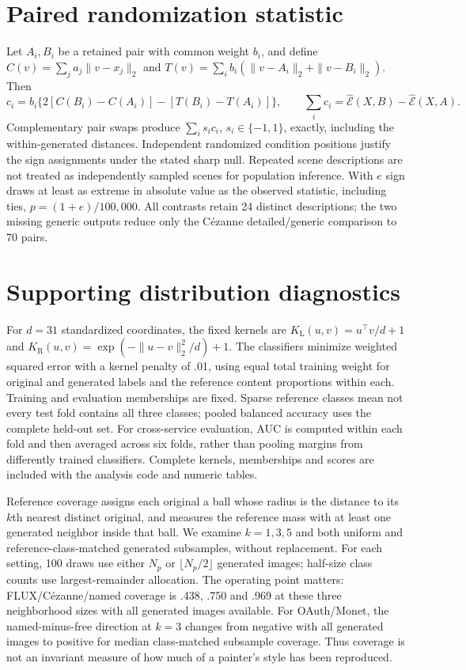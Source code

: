 \documentclass[11pt]{article}
\newcommand{\E}{\widehat{\mathcal E}}
\begin{document}
\section{Paired randomization statistic}
\label{app:inference}
Let $A_i,B_i$ be a retained pair with common weight $b_i$, and define
$C(v)=\sum_j a_j\|v-x_j\|_2$ and
$T(v)=\sum_i b_i(\|v-A_i\|_2+\|v-B_i\|_2)$. Then
\begin{equation}
 c_i=b_i\{2[C(B_i)-C(A_i)]-[T(B_i)-T(A_i)]\},\qquad
 \sum_i c_i=\E(X,B)-\E(X,A).
\end{equation}
Complementary pair swaps produce $\sum_i s_i c_i$, $s_i\in\{-1,1\}$, exactly,
including the within-generated distances. Independent randomized condition
positions justify the sign assignments under the stated sharp null. Repeated
scene descriptions are not treated as independently sampled scenes for
population inference. With $e$ sign draws at least as extreme in absolute value
as the observed statistic, including ties, $p=(1+e)/100{,}000$. All contrasts
retain 24 distinct descriptions; the two missing generic outputs reduce only
the C\'ezanne detailed/generic comparison to 70 pairs.

\section{Supporting distribution diagnostics}
\label{app:diagnostics}
For $d=31$ standardized coordinates, the fixed kernels are
$K_{\mathrm L}(u,v)=u^\top v/d+1$ and
$K_{\mathrm R}(u,v)=\exp(-\|u-v\|_2^2/d)+1$.
The classifiers minimize weighted squared error with a kernel penalty of .01,
using equal total training weight for original and generated labels and the
reference content proportions within each. Training and evaluation memberships
are fixed. Sparse reference classes mean not every test fold contains all three
classes; pooled balanced accuracy uses the complete held-out set. For cross-service evaluation, AUC is computed within each fold and then
averaged across six folds, rather than pooling margins from differently trained
classifiers. Complete kernels, memberships and scores are included with the
analysis code and numeric tables.

Reference coverage assigns each original a ball whose radius is the distance
to its $k$th nearest distinct original, and measures the reference mass with at
least one generated neighbor inside that ball. We examine $k=1,3,5$ and both
uniform and reference-class-matched generated subsamples, without replacement.
For each setting, 100 draws use either $N_p$ or $\lfloor N_p/2\rfloor$ generated
images; half-size class counts use largest-remainder allocation.
The operating point matters: FLUX/C\'ezanne/named coverage is .438, .750 and
.969 at these three neighborhood sizes with all generated images available.
For OAuth/Monet, the named-minus-free direction at $k=3$ changes from negative
with all generated images to positive for median class-matched subsample coverage.
Thus coverage is not an invariant measure of how much of a painter's style has
been reproduced.
\end{document}
